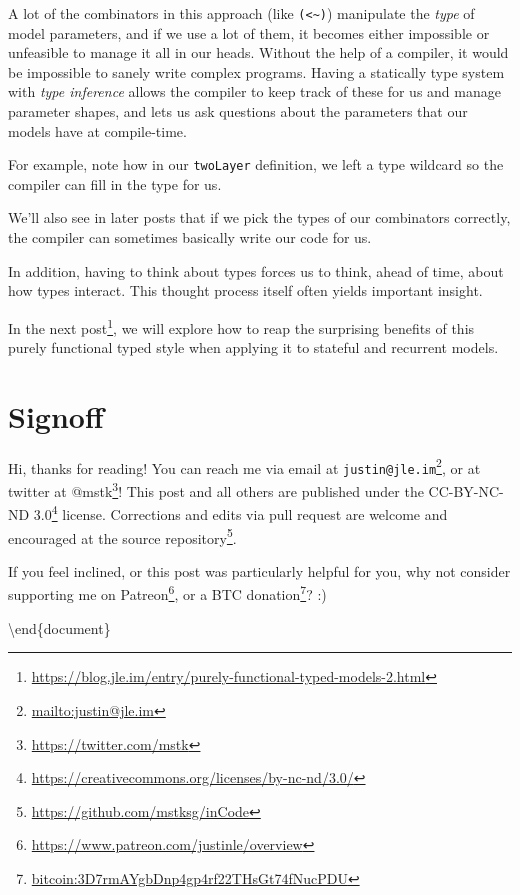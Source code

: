 \documentclass[]{article}
\renewcommand{\href}[2]{#2\footnote{\url{#1}}}
\begin{document}
\begin{enumerate}
  A lot of the combinators in this approach (like
  \texttt{(\textless{}\textasciitilde{})}) manipulate the \emph{type} of model
  parameters, and if we use a lot of them, it becomes either impossible or
  unfeasible to manage it all in our heads. Without the help of a compiler, it
  would be impossible to sanely write complex programs. Having a statically type
  system with \emph{type inference} allows the compiler to keep track of these
  for us and manage parameter shapes, and lets us ask questions about the
  parameters that our models have at compile-time.

  For example, note how in our \texttt{twoLayer} definition, we left a type
  wildcard so the compiler can fill in the type for us.

  We'll also see in later posts that if we pick the types of our combinators
  correctly, the compiler can sometimes basically write our code for us.

  In addition, having to think about types forces us to think, ahead of time,
  about how types interact. This thought process itself often yields important
  insight.
\end{enumerate}

In the
\href{https://blog.jle.im/entry/purely-functional-typed-models-2.html}{next
post}, we will explore how to reap the surprising benefits of this purely
functional typed style when applying it to stateful and recurrent models.

\section{Signoff}\label{signoff}

Hi, thanks for reading! You can reach me via email at
\href{mailto:justin@jle.im}{\nolinkurl{justin@jle.im}}, or at twitter at
\href{https://twitter.com/mstk}{@mstk}! This post and all others are published
under the \href{https://creativecommons.org/licenses/by-nc-nd/3.0/}{CC-BY-NC-ND
3.0} license. Corrections and edits via pull request are welcome and encouraged
at \href{https://github.com/mstksg/inCode}{the source repository}.

If you feel inclined, or this post was particularly helpful for you, why not
consider \href{https://www.patreon.com/justinle/overview}{supporting me on
Patreon}, or a \href{bitcoin:3D7rmAYgbDnp4gp4rf22THsGt74fNucPDU}{BTC donation}?
:)

\textbackslash end\{document\}
\end{document}
